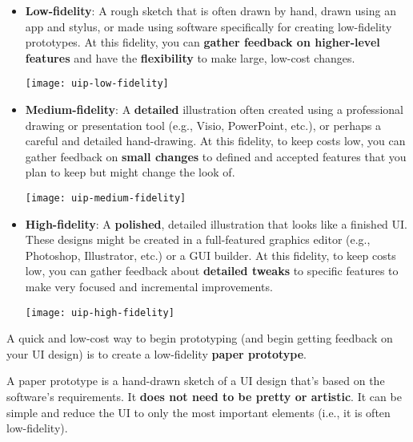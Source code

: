 \begin{itemize}

\item{\textbf{Low-fidelity}: A rough sketch that is often drawn by hand, drawn using an app and stylus, or made using software specifically for creating low-fidelity prototypes. At this fidelity, you can \textbf{gather feedback on higher-level features} and have the \textbf{flexibility} to make large, low-cost changes.
\begin{center}
\texttt{[image: uip-low-fidelity]}
\end{center}\marginpar{\guiDef\margindivider}\marginpar{\lowFidelityPrototypeDef\margindivider}\marginpar{\mediumFidelityPrototypeDef}
\spacer
}
\item{\textbf{Medium-fidelity}: A \textbf{detailed} illustration often created using a professional drawing or presentation tool (e.g., Visio, PowerPoint, etc.), or perhaps a careful and detailed hand-drawing. At this fidelity, to keep costs low, you can gather feedback on \textbf{small changes} to defined and accepted features that you plan to keep but might change the look of.
\begin{center}
\texttt{[image: uip-medium-fidelity]}
\end{center}
}

\item{\textbf{High-fidelity}: A \textbf{polished}, detailed illustration that looks like a finished UI. These designs might be created in a full-featured graphics editor (e.g., Photoshop, Illustrator, etc.) or a GUI builder. At this fidelity, to keep costs low, you can gather feedback about \textbf{detailed tweaks} to specific features to make very focused and incremental improvements.

\marginpar{\highFidelityPrototypeDef\margindivider}\marginpar{\paperPrototypeDef}
\begin{center}
\texttt{[image: uip-high-fidelity]}
\end{center}
}
\end{itemize}

A quick and low-cost way to begin prototyping (and begin getting feedback on your UI design) is to create a low-fidelity \textbf{paper prototype}.

A paper prototype is a hand-drawn sketch of a UI design that's based on the software's requirements. It \textbf{does not need to be pretty or artistic}. It can be simple and reduce the UI to only the most important elements (i.e., it is often low-fidelity).


